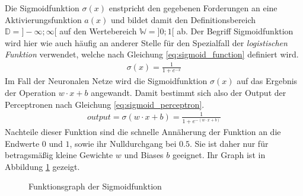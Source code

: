 \documentclass[../main.tex]{subfiles}
\begin{document}
Die Sigmoidfunktion $\sigma(x)$ enstpricht den gegebenen Forderungen an eine Aktivierungsfunktion $a(x)$ und bildet damit den Definitionsbereich $\mathbb{D} = ]-\infty; \infty [$ auf den Wertebereich $\mathbb{W} = ]0;1[$ ab. Der Begriff Sigmoidfunktion wird hier wie auch häufig an anderer Stelle für den Spezialfall der \emph{logistischen Funktion} verwendet, welche nach Gleichung \ref{eq:sigmoid_function} definiert wird.
\begin{align}
	\sigma(x) = \frac{1}{1 + e^{-x}} \label{eq:sigmoid_function}
\end{align}
Im Fall der Neuronalen Netze wird die Sigmoidfunktion $\sigma(x)$ auf das Ergebnis der Operation $w\cdot x + b$ angewandt. Damit bestimmt sich also der Output der Perceptronen nach Gleichung \ref{eq:sigmoid_perceptron}. 
\begin{align} \label{eq:sigmoid_perceptron}
	output = \sigma(w\cdot x + b) = \frac{1}{1 + e^{-(w\cdot x + b)}} 
\end{align}
Nachteile dieser Funktion sind die schnelle Annäherung der Funktion an die Endwerte $0$ und $1$, sowie ihr Nulldurchgang bei $0.5$. Sie ist daher nur für betragsmäßig kleine Gewichte $w$ und Biases $b$ geeignet. Ihr Graph ist in Abbildung \ref{fig:sigmoid} gezeigt.
\begin{figure}
	\centering
	\caption{Funktionsgraph der Sigmoidfunktion}\label{fig:sigmoid}
\end{figure}
\end{document}
